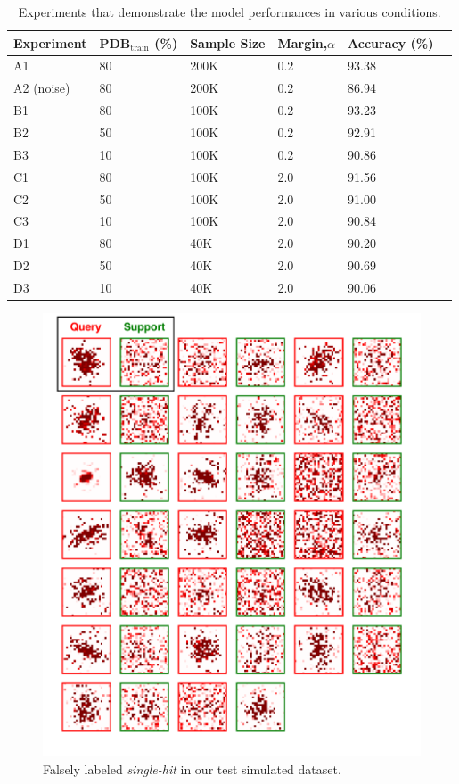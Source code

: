 \begin{table}
    \caption{Experiments that demonstrate the model performances in various
    conditions.}
    \label{tb : performance}
    \begin{tabularx}{\linewidth}{ l | X X X X X }
        Experiment  &
        PDB$_{\text{train}}$ (\%) &
        Sample Size &
        Margin,$\alpha$ &
        Accuracy (\%) \\
        \hline
        A1  & 80 & 200K &  0.2 & 93.38 \\
        A2 (noise)  & 80 & 200K &  0.2 & 86.94 \\
        \hline
        B1  & 80 & 100K &  0.2 & 93.23 \\
        B2  & 50 & 100K &  0.2 & 92.91 \\
        B3  & 10 & 100K &  0.2 & 90.86 \\
        \hline
        C1  & 80 & 100K &  2.0 & 91.56 \\
        C2  & 50 & 100K &  2.0 & 91.00 \\
        C3  & 10 & 100K &  2.0 & 90.84 \\
        \hline
        D1  & 80 & 40K  &  2.0 & 90.20 \\
        D2  & 50 & 40K  &  2.0 & 90.69 \\
        D3  & 10 & 40K  &  2.0 & 90.06 \\
    \end{tabularx}
\end{table}


\begin{figure}
\includegraphics[width=\textwidth,height=0.8\textheight,keepaspectratio]
{figures/false_label.single.simulated.pdf}
\caption{Falsely labeled \textit{single-hit} in our test simulated dataset.}
\label{fig : false single simulated}
\end{figure}
